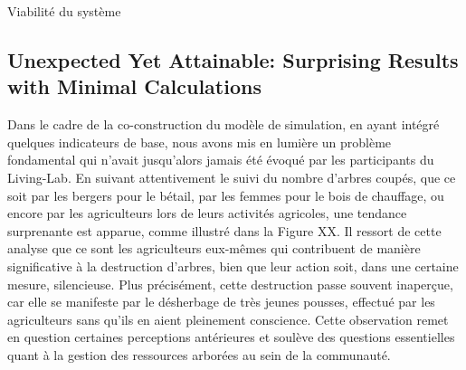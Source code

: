 \documentclass{article}
\begin{document}
Viabilité du système 

 \subsection{Unexpected Yet Attainable: Surprising Results with Minimal Calculations}

 Dans le cadre de la co-construction du modèle de simulation, en ayant intégré quelques indicateurs de base, nous avons mis en lumière un problème fondamental qui n'avait jusqu'alors jamais été évoqué par les participants du Living-Lab. En suivant attentivement le suivi du nombre d'arbres coupés, que ce soit par les bergers pour le bétail, par les femmes pour le bois de chauffage, ou encore par les agriculteurs lors de leurs activités agricoles, une tendance surprenante est apparue, comme illustré dans la Figure XX. Il ressort de cette analyse que ce sont les agriculteurs eux-mêmes qui contribuent de manière significative à la destruction d'arbres, bien que leur action soit, dans une certaine mesure, silencieuse. Plus précisément, cette destruction passe souvent inaperçue, car elle se manifeste par le désherbage de très jeunes pousses, effectué par les agriculteurs sans qu'ils en aient pleinement conscience. Cette observation remet en question certaines perceptions antérieures et soulève des questions essentielles quant à la gestion des ressources arborées au sein de la communauté.

\end{document}
